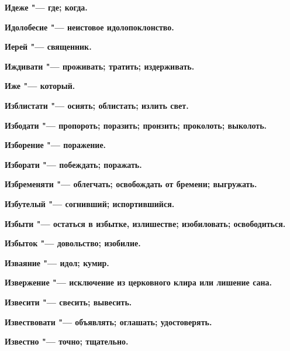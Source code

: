 \begin{multicols}{2}
\bfseries Идеже\normalfont{} "--- где; когда. 




\bfseries Идолобесие\normalfont{} "--- неистовое идолопоклонство. 




\bfseries Иерей\normalfont{} "--- священник. 




\bfseries Иждивати\normalfont{} "--- проживать; тратить; издерживать. 




\bfseries Иже\normalfont{} "--- который. 




\bfseries Изблистати\normalfont{} "--- осиять; облистать; излить свет. 




\bfseries Избодати\normalfont{} "--- пропороть; поразить; пронзить; проколоть; выколоть. 




\bfseries Изборение\normalfont{} "--- поражение. 




\bfseries Изборати\normalfont{} "--- побеждать; поражать. 




\bfseries Избременяти\normalfont{} "--- облегчать; освобождать от бремени; выгружать. 




\bfseries Избутелый\normalfont{} "--- согнивший; испортившийся. 




\bfseries Избыти\normalfont{} "--- остаться в избытке, излишестве; изобиловать; освободиться. 




\bfseries Избыток\normalfont{} "--- довольство; изобилие. 




\bfseries Изваяние\normalfont{} "--- идол; кумир. 




\bfseries Извержение\normalfont{} "--- исключение из церковного клира или лишение сана. 




\bfseries Извесити\normalfont{} "--- свесить; вывесить. 




\bfseries Извествовати\normalfont{} "--- объявлять; оглашать; удостоверять. 




\bfseries Известно\normalfont{} "--- точно; тщательно. 





\end{multicols}
